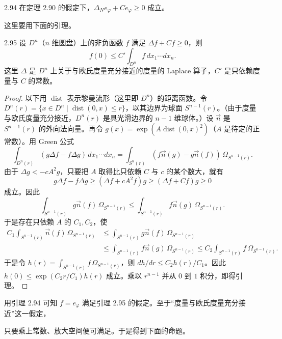 \begin{lemma}{2.94}
  在定理 2.90 的假定下，$\Delta_Ne_\varphi+Ce_\varphi\ge0$ 成立。
\end{lemma}

这里要用下面的引理。

\begin{lemma*}{2.95}
  设 $D^n$（$n$ 维圆盘）上的非负函数 $f$ 满足 $\Delta f+Cf\ge0$，则
  \[
    f(0)\le C'\int_{D^n}f\,dx_1\cdots dx_n .
  \]
  这里 $\Delta$ 是 $D^n$ 上关于与欧氏度量充分接近的度量的 Laplace 算子，$C'$ 是只依赖度量与 $C$ 的常数。
\end{lemma*}

\begin{proof}
  以下用 $\operatorname{dist}$ 表示黎曼流形（这里即 $D^n$）的距离函数。令 $D^n(r)=\{x\in D^n\mid\operatorname{dist}(0,x)\le r\}$，以其边界为球面 $S^{n-1}(r)$。（由于度量与欧氏度量充分接近，$D^n(r)$ 是具光滑边界的 $n-1$ 维球体。）设 $\vec n$ 是 $S^{n-1}(r)$ 的外向法向量。再令 $g(x)=\exp(A\operatorname{dist}(0,x)^2)$（$A$ 是待定的正常数）。用 Green 公式
  \[
    \int_{D^n(r)}(g\Delta f-f\Delta g)\,dx_1\cdots dx_n
    =\int_{S^n(r)}(f\vec n(g)-g\vec n(f))\,\Omega_{S^{n-1}(r)} .
  \]
  由于 $\Delta g<-cA^2g$，只要把 $A$ 取得比只依赖 $C$ 与 $c$ 的某个数大，就有
  \[
    g\Delta f-f\Delta g\ge(\Delta f+cA^2f)g\ge(\Delta f+Cf)g\ge0
  \]
  成立。因此
  \[
    \int_{S^{n-1}(r)}g\vec n(f)\,\Omega_{S^{n-1}(r)}
    \le\int_{S^{n-1}(r)}f\vec n(g)\,\Omega_{S^{n-1}(r)} .
  \]
  于是存在只依赖 $A$ 的 $C_1,C_2$，使
  \[
  \begin{aligned}
    C_1\int_{S^{n-1}(r)}\vec n(f)\,\Omega_{S^{n-1}(r)}
    &\le\int_{S^{n-1}(r)}g\vec n(f)\,\Omega_{S^{n-1}(r)}\\
    &\le\int_{S^{n-1}(r)}f\vec n(g)\,\Omega_{S^{n-1}(r)}
    \le C_2\int_{S^{n-1}(r)}f\,\Omega_{S^{n-1}(r)} .
  \end{aligned}
  \]
  于是令 $h(r)=\int_{S^{n-1}(r)}f\,\Omega_{S^{n-1}(r)}$，则 $dh/dr\le C_2h(r)/C_1$。因此 $h(0)\le\exp(C_2r/C_1)h(r)$ 成立。乘以 $r^{n-1}$ 并从 $0$ 到 $1$ 积分，即得引理。
\end{proof}


用引理 2.94 可知 $f=e_\varphi$ 满足引理 2.95 的假定。至于“度量与欧氏度量充分接近”这一假定，

只要乘上常数、放大空间便可满足。于是得到下面的命题。

